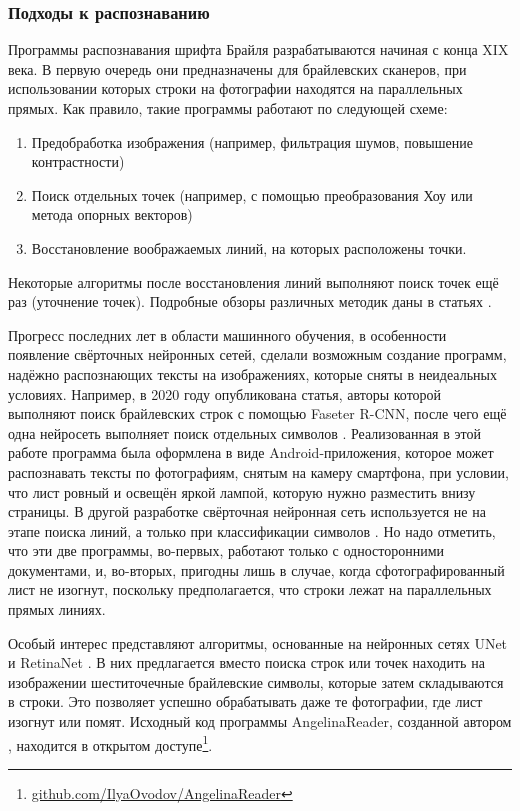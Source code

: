 \documentclass{main.tex}[subfiles]
\begin{document}
\subsubsection{Подходы к распознаванию}
Программы распознавания шрифта Брайля разрабатываются начиная с конца XIX века.
В первую очередь они предназначены для брайлевских сканеров, при использовании которых строки на фотографии находятся на параллельных прямых.
Как правило, такие программы работают по следующей схеме:
\begin{enumerate}[noitemsep]
    \item Предобработка изображения (например, фильтрация шумов, повышение контрастности)
    \item Поиск отдельных точек (например, с помощью преобразования Хоу или метода опорных векторов)
    \item Восстановление воображаемых линий, на которых расположены точки.
\end{enumerate}
Некоторые алгоритмы после восстановления линий выполняют поиск точек ещё раз (уточнение точек).
Подробные обзоры различных методик даны в статьях \cite{isayed2015review, shokat2020review}.

Прогресс последних лет в области машинного обучения, в особенности появление свёрточных нейронных сетей, сделали возможным создание программ, надёжно распознающих тексты на изображениях, которые сняты в неидеальных условиях.
Например, в 2020 году опубликована статья, авторы которой выполняют поиск брайлевских строк с помощью Faseter R-CNN, после чего ещё одна нейросеть выполняет поиск отдельных символов \cite{baumgartner2020app}.
Реализованная в этой работе программа была оформлена в виде Android-приложения, которое может распознавать тексты по фотографиям, снятым на камеру смартфона, при условии, что лист ровный и освещён яркой лампой, которую нужно разместить внизу страницы.
В другой разработке свёрточная нейронная сеть используется не на этапе поиска линий, а только при классификации символов \cite{alsalman2021}.
Но надо отметить, что эти две программы, во-первых, работают только с односторонними документами, и, во-вторых, пригодны лишь в случае, когда сфотографированный лист не изогнут, поскольку предполагается, что строки лежат на параллельных прямых линиях.

Особый интерес представляют алгоритмы, основанные на нейронных сетях UNet \cite{li2020braunet} и RetinaNet \cite{ovodov2020, ovodov2021}.
В них предлагается вместо поиска строк или точек находить на изображении шеститочечные брайлевские символы, которые затем складываются в строки.
Это позволяет успешно обрабатывать даже те фотографии, где лист изогнут или помят.
Исходный код программы AngelinaReader, созданной автором \cite{ovodov2020, ovodov2021}, находится в открытом доступе\footnote{\href{https://github.com/IlyaOvodov/AngelinaReader}{github.com/IlyaOvodov/AngelinaReader}}.
\end{document}
